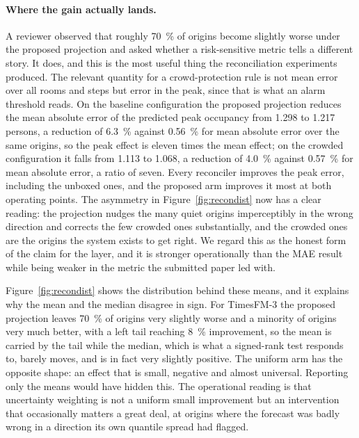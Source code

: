 \documentclass[11pt]{article}
\theoremstyle{plain}
\theoremstyle{definition}
\theoremstyle{remark}
\newif\ifrevisionmarkup
\newcommand{\new}[1]{\ifrevisionmarkup\textcolor{revision}{#1}\else#1\fi}
\begin{document}
\new{\paragraph{Where the gain actually lands.} A reviewer observed that roughly \SI{70}{\percent} of origins become slightly worse under the proposed projection and asked whether a risk-sensitive metric tells a different story. It does, and this is the most useful thing the reconciliation experiments produced. The relevant quantity for a crowd-protection rule is not mean error over all rooms and steps but error in the peak, since that is what an alarm threshold reads. On the baseline configuration the proposed projection reduces the mean absolute error of the predicted peak occupancy from \num{1.298} to \num{1.217} persons, a reduction of \SI{6.3}{\percent} against \SI{0.56}{\percent} for mean absolute error over the same origins, so the peak effect is eleven times the mean effect; on the crowded configuration it falls from \num{1.113} to \num{1.068}, a reduction of \SI{4.0}{\percent} against \SI{0.57}{\percent} for mean absolute error, a ratio of seven. Every reconciler improves the peak error, including the unboxed ones, and the proposed arm improves it most at both operating points. The asymmetry in Figure~\ref{fig:recondist} now has a clear reading: the projection nudges the many quiet origins imperceptibly in the wrong direction and corrects the few crowded ones substantially, and the crowded ones are the origins the system exists to get right. We regard this as the honest form of the claim for the layer, and it is stronger operationally than the MAE result while being weaker in the metric the submitted paper led with.}

Figure~\ref{fig:recondist} shows the distribution behind these means\new{, and it explains why the mean and the median disagree in sign}. For TimesFM-3 the proposed projection leaves \SI{70}{\percent} of origins very slightly worse and a minority of origins very much better, with a left tail reaching \SI{8}{\percent} improvement, so the mean is carried by the tail while the median, which is what a signed-rank test responds to, barely moves\new{, and is in fact very slightly positive}. The uniform arm has the opposite shape: an effect that is small, negative and almost universal. Reporting only the means would have hidden this. The operational reading is that uncertainty weighting is not a uniform small improvement but an intervention that occasionally matters a great deal, at origins where the forecast was badly wrong in a direction its own quantile spread had flagged.
\end{document}
